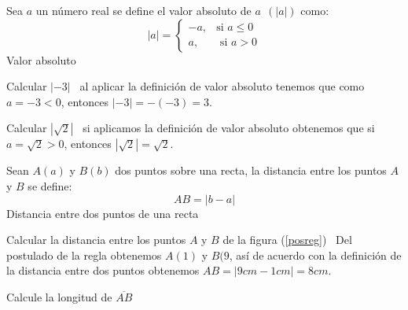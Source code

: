 \documentclass[12pt]{book}
\begin{document}
\begin{definicion}{ Sea $a$ un n\'{u}mero real se define el valor absoluto de $a~\ (\left\vert
a\right\vert )$ como:%
\begin{equation*}
\left\vert a\right\vert =\left\{
\begin{array}{cc}
-a, & \text{si }a\leq 0 \\
a, & \text{ si }a>0%
\end{array}%
\right.
\end{equation*}}{Valor absoluto}
 \end{definicion}
\begin{ejemplo}{ Calcular $\left\vert -3\right\vert $}
 \solucion \, al aplicar la definición de valor absoluto tenemos que como $a=-3<0$, entonces $\left\vert -3\right\vert =-\left( -3\right) =3$.
\end{ejemplo}
\begin{ejemplo}{Calcular $\left\vert \sqrt{2}\right\vert$}
\solucion \, si aplicamos la definición de valor absoluto obtenemos que si  $a=\sqrt{2}>0$, entonces $\left\vert \sqrt{2}\right\vert =\sqrt{2}$.
\end{ejemplo}
\begin{definicion}{Sean $A\left( a\right) $ y $B\left( b\right) $ dos puntos sobre una recta,
la distancia entre los puntos $A$ y $B$ se define:%
\begin{equation*}
AB=\left\vert b-a\right\vert
\end{equation*}}{Distancia entre dos puntos de una recta}
 \begin{ejemplo}{Calcular la distancia entre los puntos $A$ y $B$ de la figura (\ref{posreg})}
  \solucion\, Del postulado de la regla obtenemos $A(1)$ y $B(9$, así de acuerdo
con la definición de la
distancia entre dos puntos obtenemos $AB=|9cm-1cm|= 8cm$.
  \end{ejemplo}
\begin{ejemplo}{Calcule la longitud de $\overline{AB}$}
 \begin{center}
\end{center}
\end{ejemplo}

\end{definicion}
\end{document}
